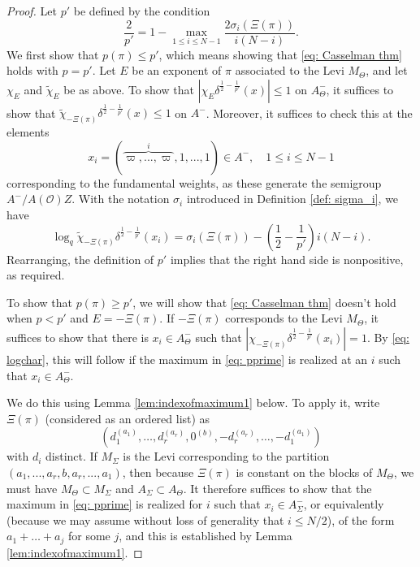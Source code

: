 \documentclass{amsart}
\newcommand{\f}{\frac}
\newcommand{\1}{\m 1}
\theoremstyle{remark}
\theoremstyle{definition}
\numberwithin{equation}{subsection}
\begin{document}
\begin{proof}
Let $p'$ be defined by the condition
\begin{equation}\label{eq: pprime}
\f 2{p'} =  1 - \max_{1 \leq i \leq N-1} \f{2 \sigma_i(\Xi(\pi))}{i(N-i)}.
\end{equation}
We first show that $p(\pi) \le p'$, which means showing that \eqref{eq: Casselman thm} holds with $p = p'$.  Let $E$ be an exponent of $\pi$ associated to the Levi $M_\Theta$, and let $\chi_E$ and $\widetilde{\chi}_E$ be as above.  To show that $\left|\chi_E \delta^{\frac{1}{2}-\frac{1}{p'}}(x)\right| \leq 1$ on $A_\Theta^{-}$, it suffices to show that $\widetilde{\chi}_{-\Xi(\pi)} \delta^{\frac{1}{2}-\frac{1}{p'}}(x) \leq 1$ on $A^{-}$.  Moreover, it suffices to check this at the elements
\[
x_{i} = (\overbrace{\varpi,...,\varpi}^{i},1,...,1) \in A^-, \quad 1 \leq i \leq N-1
\] 
corresponding to the fundamental weights, as these generate the semigroup $A^- / A(\mathcal{O}) Z$. With the notation $\sigma_i$ introduced in Definition \ref{def: sigma_i}, we have 
\begin{equation}\label{eq: logchar}
\log_q \widetilde{\chi}_{-\Xi(\pi)} \delta^{\frac{1}{2}-\frac{1}{p'}}(x_i) = \sigma_i(\Xi(\pi))-\left(\frac{1}{2}-\frac1{p'} \right)i(N-i).
\end{equation}
Rearranging, the definition of $p'$ implies that the right hand side is nonpositive, as required.
\medskip

To show that $p(\pi) \ge p'$, we will show that \eqref{eq: Casselman thm} doesn't hold when $p < p'$ and $E = -\Xi(\pi)$.  If $-\Xi(\pi)$ corresponds to the Levi $M_\Theta$, it suffices to show that there is $x_i \in A_\Theta^-$ such that $| \chi_{-\Xi(\pi)} \delta^{\frac{1}{2}-\frac{1}{p'}}(x_i)| = 1$.  By \eqref{eq: logchar}, this will follow if the maximum in \eqref{eq: pprime} is realized at an $i$ such that $x_i \in A_\Theta^-$.

We do this using Lemma \ref{lem:indexofmaximum1} below.  To apply it, write $\Xi(\pi)$ (considered as an ordered list) as 
\[
(d_1^{(a_1)}, \dotsc, d_r^{(a_r)}, 0^{(b)}, -d_r^{(a_r)}, \dotsc, -d_1^{(a_1)})
\] 
with $d_i$ distinct.  If $M_\Sigma$ is the Levi corresponding to the partition $(a_1,...,a_r,b,a_r,...,a_1)$, then because $\Xi(\pi)$ is constant on the blocks of $M_\Theta$, we must have $M_\Theta \subset M_\Sigma$ and $A_\Sigma \subset A_\Theta$.  It therefore suffices to show that the maximum in \eqref{eq: pprime} is realized for $i$ such that $x_i \in A_\Sigma^-$, or equivalently (because we may assume without loss of generality that $i \le N/2$), of the form $a_1 + \ldots + a_j$ for some $j$, and this is established by Lemma \ref{lem:indexofmaximum1}.

\end{proof}
\end{document}
